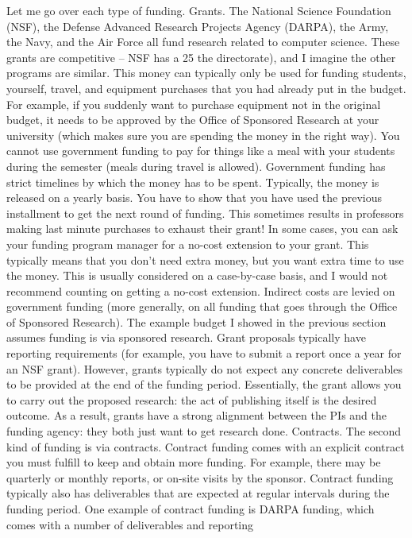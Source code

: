 \documentclass[oneside,11pt]{memoir}
\begin{document}
Let me go over each type of funding.
Grants. The National Science Foundation (NSF), the Defense Advanced Research Projects
Agency (DARPA), the Army, the Navy, and the Air Force all fund research related to computer
science. These grants are competitive – NSF has a 25%
the directorate), and I imagine the other programs are similar.
This money can typically only be used for funding students, yourself, travel, and equipment
purchases that you had already put in the budget. For example, if you suddenly want to
purchase equipment not in the original budget, it needs to be approved by the Office of
Sponsored Research at your university (which makes sure you are spending the money in the
right way). You cannot use government funding to pay for things like a meal with your students
during the semester (meals during travel is allowed).
Government funding has strict timelines by which the money has to be spent. Typically, the
money is released on a yearly basis. You have to show that you have used the previous
installment to get the next round of funding. This sometimes results in professors making last
minute purchases to exhaust their grant!
In some cases, you can ask your funding program manager for a no-cost extension to your
grant. This typically means that you don’t need extra money, but you want extra time to use the
money. This is usually considered on a case-by-case basis, and I would not recommend
counting on getting a no-cost extension.
Indirect costs are levied on government funding (more generally, on all funding that goes
through the Office of Sponsored Research). The example budget I showed in the previous
section assumes funding is via sponsored research.
Grant proposals typically have reporting requirements (for example, you have to submit a report
once a year for an NSF grant). However, grants typically do not expect any concrete deliverables
to be provided at the end of the funding period. Essentially, the grant allows you to carry out the
proposed research: the act of publishing itself is the desired outcome. As a result, grants have a
strong alignment between the PIs and the funding agency: they both just want to get research
done.
Contracts. The second kind of funding is via contracts. Contract funding comes with an explicit
contract you must fulfill to keep and obtain more funding. For example, there may be quarterly
or monthly reports, or on-site visits by the sponsor. Contract funding typically also has
deliverables that are expected at regular intervals during the funding period. One example of
contract funding is DARPA funding, which comes with a number of deliverables and reporting
\end{document}
